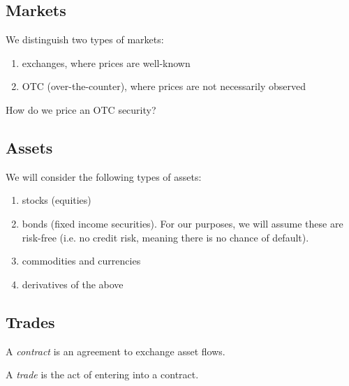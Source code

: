 \documentclass{report}
\numberwithin{problem}{chapter} %
\begin{document}
\subsection{Markets}
We distinguish two types of markets:
\begin{enumerate}  
\item exchanges, where prices are well-known
\item OTC (over-the-counter), where prices are not necessarily observed
\end{enumerate}
How do we price an OTC security?

\subsection{Assets}
We will consider the following types of assets:
\begin{enumerate}  
\item stocks (equities)
\item bonds (fixed income securities). For our purposes, we will assume these are risk-free (i.e. no credit risk, meaning there is no chance of default).
\item commodities and currencies
\item derivatives of the above
\end{enumerate}

\subsection{Trades}
A  {\it contract} is an agreement to exchange asset flows. 

A {\it trade} is the act of entering into a contract.
\end{document}
